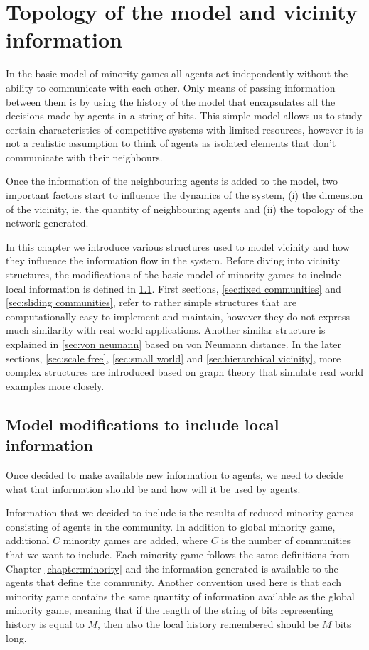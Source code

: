 \chapter{Topology of the model and vicinity information}
\label{chapter:vicinity}

In the basic model of minority games all agents act independently without the ability to communicate with each other.
Only means of passing information between them is by using the history of the model that encapsulates all the decisions made by agents in a string of bits.
This simple model allows us to study certain characteristics of competitive systems with limited resources, however it is not a realistic assumption to think of agents as isolated elements that don't communicate with their neighbours.

Once the information of the neighbouring agents is added to the model, two important factors start to influence the dynamics of the system, (i) the dimension of the vicinity, ie. the quantity of neighbouring agents and (ii) the topology of the network generated.

In this chapter we introduce various structures used to model vicinity and how they influence the information flow in the system.
Before diving into vicinity structures, the modifications of the basic model of minority games to include local information is defined in \ref{sec:model modifications}.
First sections, \ref{sec:fixed communities} and \ref{sec:sliding communities}, refer to rather simple structures that are computationally easy to implement and maintain, however they do not express much similarity with real world applications. 
Another similar structure is explained in \ref{sec:von neumann} based on von Neumann distance. 
In the later sections, \ref{sec:scale free}, \ref{sec:small world} and \ref{sec:hierarchical vicinity}, more complex structures are introduced based on graph theory that simulate real world examples more closely. 

\section{Model modifications to include local information}
\label{sec:model modifications}

Once decided to make available new information to agents, we need to decide what that information should be and how will it be used by agents.

Information that we decided to include is the results of reduced minority games consisting of agents in the community.
In addition to global minority game, additional $C$ minority games are added, where $C$ is the number of communities that we want to include.
Each minority game follows the same definitions from Chapter \ref{chapter:minority} and the information generated is available to the agents that define the community. 
Another convention used here is that each minority game contains the same quantity of information available as the global minority game, meaning that if the length of the string of bits representing history is equal to $M$, then also the local history remembered should be $M$ bits long.

